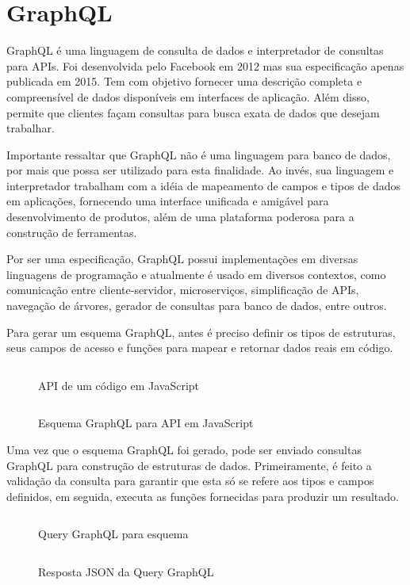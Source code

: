\section{GraphQL}

GraphQL é uma linguagem de consulta de dados e interpretador de consultas para APIs. Foi desenvolvida pelo Facebook em 2012 mas sua especificação apenas publicada em 2015. Tem com objetivo fornecer uma descrição completa e compreensível de dados disponíveis em interfaces de aplicação. Além disso, permite que clientes façam consultas para busca exata de dados que desejam trabalhar. \cite{GraphQL2016}

Importante ressaltar que GraphQL não é uma linguagem para banco de dados, por mais que possa ser utilizado para esta finalidade. Ao invés, sua linguagem e interpretador trabalham com a idéia de mapeamento de campos e tipos de dados em aplicações, fornecendo uma interface unificada e amigável para desenvolvimento de produtos, além de uma plataforma poderosa para a construção de ferramentas. \cite{GraphQL2016}

Por ser uma especificação, GraphQL possui implementações em diversas linguagens de programação e atualmente é usado em diversos contextos, como comunicação entre cliente-servidor, microserviços, simplificação de APIs, navegação de árvores, gerador de consultas para banco de dados, entre outros.

Para gerar um esquema GraphQL, antes é preciso definir os tipos de estruturas, seus campos de acesso e funções para mapear e retornar dados reais em código.

\begin{figure}[H]
  \centering
  \inputminted[frame=single,framesep=10pt]{javascript}{anexos/pessoa.js}
  \caption{API de um código em JavaScript}
\end{figure}

\begin{figure}[H]
  \centering
  \inputminted[frame=single,framesep=10pt]{javascript}{anexos/pessoa-graphql-schema.txt}
  \caption{Esquema GraphQL para API em JavaScript}
\end{figure}

Uma vez que o esquema GraphQL foi gerado, pode ser enviado consultas GraphQL para construção de estruturas de dados. Primeiramente, é feito a validação da consulta para garantir que esta só se refere aos tipos e campos definidos, em seguida, executa as funções fornecidas para produzir um resultado. \cite{GraphQL2016}

\begin{figure}[H]
  \centering
  \inputminted[frame=single,framesep=10pt]{javascript}{anexos/pessoa-graphql-query.txt}
  \caption{Query GraphQL para esquema}
\end{figure}

\begin{figure}[H]
  \centering
  \inputminted[frame=single,framesep=10pt]{javascript}{anexos/pessoa-graphql-query-response.json}
  \caption{Resposta JSON da Query GraphQL}
\end{figure}




